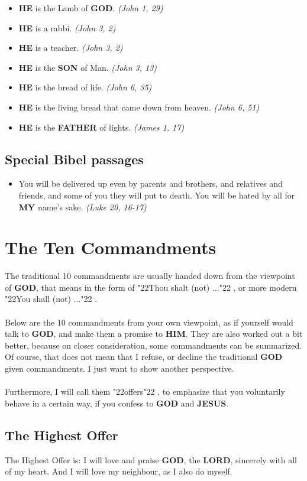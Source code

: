 \documentclass[12pt,a5paper]{article}
\newcommand{\God}[0]{\textbf{GOD}}
\newcommand{\Father}[0]{\textbf{FATHER}}
\newcommand{\He}[0]{\textbf{HE}}
\newcommand{\Him}[0]{\textbf{HIM}}
\newcommand{\Jesus}[0]{\textbf{JESUS}}
\newcommand{\Lord}[0]{\textbf{LORD}}
\newcommand{\My}[0]{\textbf{MY}}
\newcommand{\Son}[0]{\textbf{SON}}
\newcommand{\q}[1]{\char"22{#1}\char"22 }
\begin{document}
\begin{itemize}[nosep]
			\item {\He} is the Lamb of {\God}. \textit{(John 1, 29)}
			\item {\He} is a rabbi. \textit{(John 3, 2)}
			\item {\He} is a teacher. \textit{(John 3, 2)}
			\item {\He} is the {\Son} of Man. \textit{(John 3, 13)}
			\item {\He} is the bread of life. \textit{(John 6, 35)}
			\item {\He} is the living bread that came down from heaven. \textit{(John 6, 51)}
			\item {\He} is the {\Father} of lights. \textit{(James 1, 17)}		
		\end{itemize}

	\newpage
	\subsection{Special Bibel passages}
		\begin{itemize}[nosep]
			\item	You will be delivered up even by parents and brothers,
					and relatives and friends,
					and some of you they will put to death.
					You will be hated by all for {\My} name's sake.
					\textit{(Luke 20, 16-17)}
		\end{itemize}

	\newpage
	\section{The Ten Commandments}
		The traditional 10 commandments are usually handed down from the viewpoint of {\God},
		that means in the form of \q{Thou shalt (not) ...},
		or more modern \q{You shall (not) ...}.
		\\
		\\
		Below are the 10 commandments from your own viewpoint,
		as if yourself would talk to {\God},
		and make them a promise to {\Him}.
		They are also worked out a bit better,
		because on closer consideration,
		some commandments can be summarized.
		Of course,
		that does not mean that I refuse,
		or decline the traditional {\God} given commandments.
		I just want to show another perspective.
		\\
		\\
		Furthermore,
		I will call them \q{offers},
		to emphasize that you voluntarily behave in a certain way,
		if you confess to {\God} and {\Jesus}.
	
	\subsection{The Highest Offer}
		The Highest Offer is:
		I will love and praise {\God},
		the {\Lord},
		sincerely with all of my heart.
		And I will love my neighbour,
		as I also do myself.
		
\end{document}
